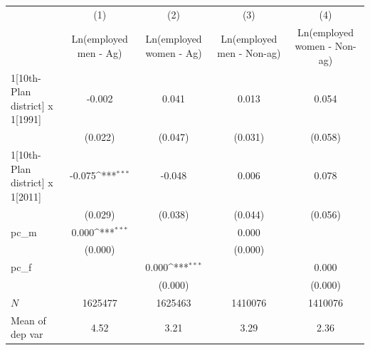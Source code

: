{
\def\sym#1{\ifmmode^{#1}\else\(^{#1}\)\fi}
\begin{tabular}{l*{4}{c}}
\hline\hline
            &\multicolumn{1}{c}{(1)}         &\multicolumn{1}{c}{(2)}         &\multicolumn{1}{c}{(3)}         &\multicolumn{1}{c}{(4)}         \\
            &Ln(employed men - Ag)         &Ln(employed women - Ag)         &Ln(employed men - Non-ag)         &Ln(employed women - Non-ag)         \\
\hline
1[10th-Plan district] x 1[1991]&      -0.002         &       0.041         &       0.013         &       0.054         \\
            &     (0.022)         &     (0.047)         &     (0.031)         &     (0.058)         \\
[1em]
1[10th-Plan district] x 1[2011]&      -0.075\sym{***}&      -0.048         &       0.006         &       0.078         \\
            &     (0.029)         &     (0.038)         &     (0.044)         &     (0.056)         \\
[1em]
pc\_m        &       0.000\sym{***}&                     &       0.000         &                     \\
            &     (0.000)         &                     &     (0.000)         &                     \\
[1em]
pc\_f        &                     &       0.000\sym{***}&                     &       0.000         \\
            &                     &     (0.000)         &                     &     (0.000)         \\
\hline
\(N\)       &     1625477         &     1625463         &     1410076         &     1410076         \\
Mean of dep var&        4.52         &        3.21         &        3.29         &        2.36         \\
\hline\hline
\end{tabular}
}
